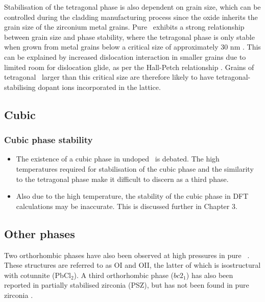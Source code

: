 Stabilisation of the tetragonal phase is also dependent on grain size, which can be controlled during the cladding manufacturing process since the oxide inherits the grain size of the zirconium metal grains. Pure \zirconia\ exhibits a strong relationship between grain size and phase stability, where the tetragonal phase is only stable when grown from metal grains below a critical size of approximately 30 nm \cite{barberis1995zirconia}. This can be explained by increased dislocation interaction in smaller grains due to limited room for dislocation glide, as per the Hall-Petch relationship \cite{hall1951deformation, petch1953cleavage}. Grains of tetragonal \zirconia\ larger than this critical size are therefore likely to have tetragonal-stabilising dopant ions incorporated in the lattice.

\subsection{Cubic}

\subsubsection{Cubic phase stability}

\begin{itemize}
\item The existence of a cubic phase in undoped \zirconia\ is debated. The high temperatures required for stabilisation of the cubic phase and the similarity to the tetragonal phase make it difficult to discern as a third phase.
\item Also due to the high temperature, the stability of the cubic phase in DFT calculations may be inaccurate. This is discussed further in Chapter 3.
\end{itemize}



\subsection{Other phases}

Two orthorhombic phases have also been observed at high pressures in pure \zirconia\ \cite{howard1991crystal}. These structures are referred to as OI and OII, the latter of which is isostructural with cotunnite (PbCl$_{2}$). A third orthorhombic phase ($bc2_{1}$) has also been reported in partially stabilised zirconia (PSZ), but has not been found in pure zirconia \cite{kisi1998crystal}.

